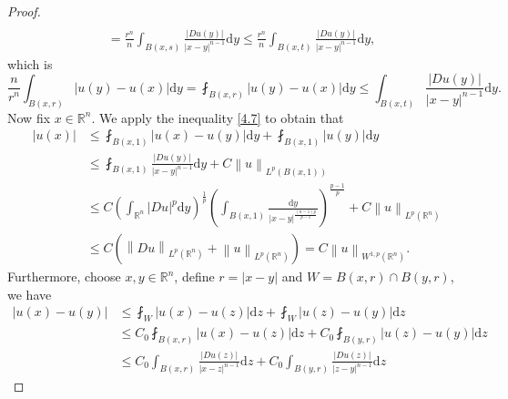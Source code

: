 \begin{proof}
$$\begin{aligned}
\\
&=\frac{r^n}{n}\int_{B\left( x,s \right)}{\frac{\left| Du\left( y \right) \right|}{\left| x-y \right|^{n-1}}\mathrm{d}y}\le \frac{r^n}{n}\int_{B\left( x,t \right)}{\frac{\left| Du\left( y \right) \right|}{\left| x-y \right|^{n-1}}\mathrm{d}y},
\end{aligned}
$$
which is 
$$
\frac{n}{r^n}\int_{B\left( x,r \right)}{\left| u\left( y \right) -u\left( x \right) \right|\mathrm{d}y}=\fint_{B\left( x,r \right)}{\left| u\left( y \right) -u\left( x \right) \right|\mathrm{d}y}\le \int_{B\left( x,t \right)}{\frac{\left| Du\left( y \right) \right|}{\left| x-y \right|^{n-1}}\mathrm{d}y}.
$$
Now fix $x\in\mathbb{R}^n$. We apply the inequality \eqref{4.7} to obtain that 
$$
\begin{aligned}
\left| u\left( x \right) \right|&\le \fint_{B\left( x,1 \right)}{\left| u\left( x \right) -u\left( y \right) \right|\mathrm{d}y}+\fint_{B\left( x,1 \right)}{\left| u\left( y \right) \right|\mathrm{d}y}
\\
&\le \fint_{B\left( x,1 \right)}{\frac{\left| Du\left( y \right) \right|}{\left| x-y \right|^{n-1}}\mathrm{d}y}+C\left\| u \right\| _{L^p\left( B\left( x,1 \right) \right)}
\\
&\le C\left( \int_{\mathbb{R} ^n}{\left| Du \right|^p\mathrm{d}y} \right) ^{\frac{1}{p}}\left( \int_{B\left( x,1 \right)}{\frac{\mathrm{d}y}{\left| x-y \right|^{\frac{\left( n-1 \right) p}{p-1}}}} \right) ^{\frac{p-1}{p}}+C\left\| u \right\| _{L^p\left( \mathbb{R} ^n \right)}
\\
&\le C\left( \left\| Du \right\| _{L^p\left( \mathbb{R} ^n \right)}+\left\| u \right\| _{L^p\left( \mathbb{R} ^n \right)} \right) =C\left\| u \right\| _{W^{1,p}\left( \mathbb{R} ^n \right)}.
\end{aligned}
$$
Furthermore, choose $x,y\in\mathbb{R}^n$, define $r=|x-y|$ and $W=B(x,r)\cap B(y,r)$, we have 
$$
\begin{aligned}
\left| u\left( x \right) -u\left( y \right) \right|&\le \fint_W{\left| u\left( x \right) -u\left( z \right) \right|\mathrm{d}z}+\fint_W{\left| u\left( z \right) -u\left( y \right) \right|\mathrm{d}z}
\\
&\le C_0\fint_{B\left( x,r \right)}{\left| u\left( x \right) -u\left( z \right) \right|\mathrm{d}z}+C_0\fint_{B\left( y,r \right)}{\left| u\left( z \right) -u\left( y \right) \right|\mathrm{d}z}
\\
&\le C_0\int_{B\left( x,r \right)}{\frac{\left| Du\left( z \right) \right|}{\left| x-z \right|^{n-1}}\mathrm{d}z}+C_0\int_{B\left( y,r \right)}{\frac{\left| Du\left( z \right) \right|}{\left| z-y \right|^{n-1}}\mathrm{d}z}

\end{aligned}$$
\end{proof}
